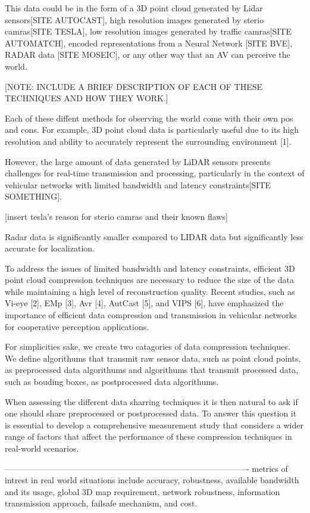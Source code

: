 \documentclass[conference]{IEEEtran}
\begin{document}
This data could be in the form of a 3D point cloud generated by Lidar sensors[SITE AUTOCAST], high resolution images generated by sterio camras[SITE TESLA], low resolution images generated by traffic camras[SITE AUTOMATCH], encoded representations from a Neural Network [SITE BVE], RADAR data [SITE MOSEIC], or any other way that an AV can perceive the world.

[NOTE: INCLUDE A BRIEF DESCRIPTION OF EACH OF THESE TECHNIQUES AND HOW THEY WORK.]

Each of these diffent methods for observing the world come with their own pos and cons. For example, 3D point cloud data is particularly useful due to its high resolution and ability to accurately represent the surrounding environment [1]. 

However, the large amount of data generated by LiDAR sensors presents challenges for real-time transmission and processing, particularly in the context of vehicular networks with limited bandwidth and latency constraints[SITE SOMETHING]. 

[insert tesla's reason for sterio camras and their known flaws]

Radar data is significantly smaller compared to LIDAR data but significantly less accurate for localization.

To address the issues of limited bandwidth and latency constraints, efficient 3D point cloud compression techniques are necessary to reduce the size of the data while maintaining a high level of reconstruction quality. Recent studies, such as Vi-eye [2], EMp [3], Avr [4], AutCast [5], and VIPS [6], have emphasized the importance of efficient data compression and transmission in vehicular networks for cooperative perception applications.

For simplicities sake, we create two catagories of data compression techniques. We define algorithums that transmit raw sensor data, such as point cloud points, as \bold preprocessed data algorithums and algorithums that transmit processed data, such as bouding boxes, as \bold postprocessed data algorithums.

When assessing the different data sharring techniques it is then natural to ask if one should share preprocessed or postprocessed data.  To answer this question it is essential to develop a comprehensive measurement study that considers a wider range of factors that affect the performance of these compression techniques in real-world scenarios. 


----------------------------------------------------------------------------------------
metrics of intrest in real world situations include accuracy, robustness, available bandwidth and its usage, global 3D map requirement, network robustness, information transmission approach, failsafe mechanism, and cost. 
\end{document}
